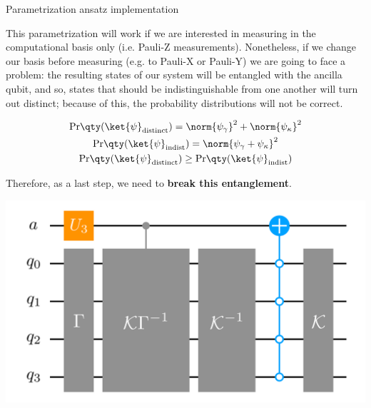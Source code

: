 \begin{frame}[allowframebreaks]{Parametrization ansatz implementation}
\begin{multicols}{2}
		This parametrization will work if we are interested in measuring in the computational basis only (i.e. Pauli-Z measurements). Nonetheless, if we change our basis before measuring (e.g. to Pauli-X or Pauli-Y) we are going to face a problem: the resulting states of our system will be entangled with the ancilla qubit, and so, states that should be indistinguishable from one another will turn out distinct; because of this, the probability distributions will not be correct.

		\begin{gather*}
		  \text{Pr} \qty(\ket{\psi}_{\text{distinct}}) =
		    \norm{\psi_\gamma}^2 + \norm{\psi_\kappa}^2 \\
		  \text{Pr} \qty(\ket{\psi}_{\text{indist}}) =
		    \norm{\psi_\gamma + \psi_\kappa}^2 \\
		  \text{Pr} \qty(\ket{\psi}_{\text{distinct}}) \geq
		    \text{Pr} \qty(\ket{\psi}_{\text{indist}})
		\end{gather*}

		\columnbreak

		Therefore, as a last step, we need to \textbf{break this entanglement}.

		\begin{center}
			\includegraphics[width=.4\paperwidth]{Figures/NJL1-model-solving/ansatz-implementation-circuit}
		\end{center}

	\end{multicols}

\end{frame}


